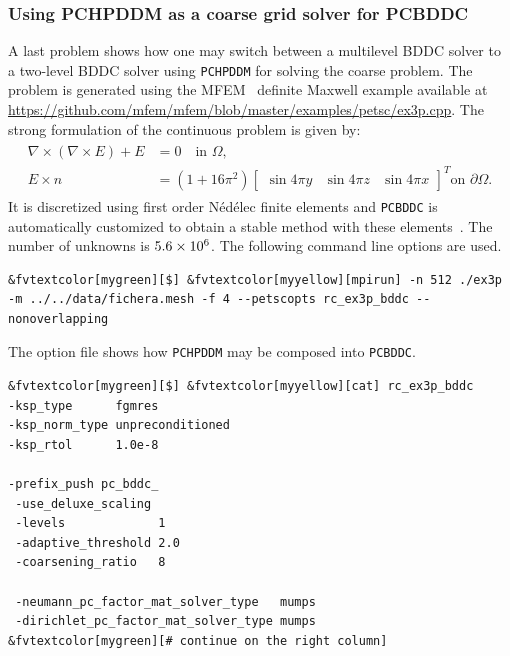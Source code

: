 \documentclass[3p,11pt]{elsarticle}
\newcommand{\pk}[1]{\texttt{#1}}
\begin{document}
    \subsubsection{Using PCHPDDM as a coarse grid solver for PCBDDC\label{sec:bddc}}
A last problem shows how one may switch between a multilevel
BDDC solver to a two-level BDDC solver using \pk{PCHPDDM} for solving the
coarse problem. The problem is generated using the MFEM~\cite{anderson2019mfem}
definite Maxwell example available at \url{https://github.com/mfem/mfem/blob/master/examples/petsc/ex3p.cpp}.
The strong formulation of the continuous problem is given by:
\begin{align}
	\label{eq:maxwell}
	\begin{split}
        \nabla \times (\nabla \times E) + E	&= 0	\quad \text{in } \Omega,\\
        E \times n					&= (1+16\pi^2)\begin{bmatrix} \sin{4\pi y}&
        \sin{4\pi z}&\sin{4\pi x} \end{bmatrix}^T \text{on } \partial \Omega.
	\end{split}
\end{align}
It is discretized using first order Nédélec finite elements and \pk{PCBDDC}
is automatically customized to obtain a stable method with these
elements~\cite{zampini2017balancing}. The number of unknowns is $\pgfmathprintnumber{5.6} \times 10^6$.
The following command line options are used. \\[-4pt]
\begin{Verbatim}[fontsize=\footnotesize,frame=single,framerule=0.1mm,commandchars=&\[\]]
&fvtextcolor[mygreen][$] &fvtextcolor[myyellow][mpirun] -n 512 ./ex3p -m ../../data/fichera.mesh -f 4 --petscopts rc_ex3p_bddc --nonoverlapping
\end{Verbatim}
The option file shows how \pk{PCHPDDM} may be composed into \pk{PCBDDC}. \\[-4pt]
\begin{minipage}[t]{0.565\textwidth}
\begin{Verbatim}[fontsize=\footnotesize,frame=single,framerule=0.1mm,commandchars=&\[\]]
&fvtextcolor[mygreen][$] &fvtextcolor[myyellow][cat] rc_ex3p_bddc
-ksp_type      fgmres
-ksp_norm_type unpreconditioned
-ksp_rtol      1.0e-8

-prefix_push pc_bddc_
 -use_deluxe_scaling
 -levels             1
 -adaptive_threshold 2.0
 -coarsening_ratio   8

 -neumann_pc_factor_mat_solver_type   mumps
 -dirichlet_pc_factor_mat_solver_type mumps
&fvtextcolor[mygreen][# continue on the right column]
\end{Verbatim}
\end{minipage}
\end{document}
